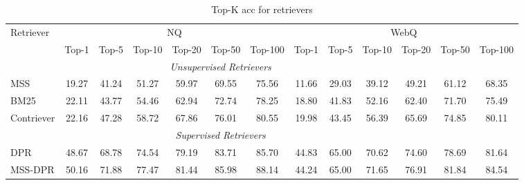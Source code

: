 
\begin{table*}[!ht]
\addtolength{\tabcolsep}{-0.65pt}
\small
\centering
\begin{tabular}{@{}l|cccccc|cccccc@{}}
\toprule
Retriever &  \multicolumn{6}{c}{NQ} & \multicolumn{6}{c}{WebQ}  \\

& Top-1 & Top-5 &Top-10 & Top-20 &Top-50 & Top-100 & Top-1 & Top-5 &Top-10 & Top-20 &Top-50 & Top-100 \\
\midrule
\multicolumn{11}{c}{\textit{Unsupervised Retrievers}} \\
\midrule
MSS         &  19.27 & 41.24 &  51.27 &  59.97 & 69.55  &  75.56 &  11.66 & 29.03 & 39.12  & 49.21 &  61.12 & 68.35\\

BM25        &  22.11 &  43.77 &  54.46 & 62.94  & 72.74  & 78.25    &  18.80  &  41.83 & 52.16  & 62.40 & 71.70 & 75.49\\


Contriever &  22.16 & 47.28 & 58.72 & 67.86 & 76.01 & 80.55 &  19.98 & 43.45 & 56.39  &65.69  & 74.85& 80.11\\




\midrule
\multicolumn{11}{c}{\textit{Supervised Retrievers}} \\
\midrule
DPR     & 48.67  &   68.78  &   74.54 &  79.19 & 83.71  & 85.70    &44.83   & 65.00 & 70.62  & 74.60 & 78.69 & 81.64\\


MSS-DPR    & 50.16 &  71.88  & 77.47 & 81.44 & 85.98 & 88.14 & 44.24  & 65.00 &  71.65 & 76.91 & 81.84 & 84.54\\

\midrule
\end{tabular}
\caption{ Top-K acc for retrievers
}
\label{tab:qa}
\end{table*}



